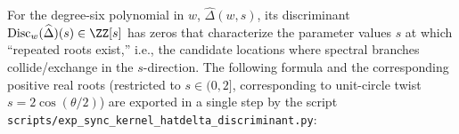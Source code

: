 \begin{remark}\label{rem:sync-hatdelta-discriminant-branch}
For the degree-six polynomial in \(w\), \(\widehat\Delta(w,s)\), its discriminant \(\mathrm{Disc}_w(\widehat\Delta)(s)\in\ZZ[s]\) has zeros that characterize the parameter values \(s\) at which ``repeated roots exist,'' i.e., the candidate locations where spectral branches collide/exchange in the \(s\)-direction.
The following formula and the corresponding positive real roots (restricted to \(s\in(0,2]\), corresponding to unit-circle twist \(s=2\cos(\theta/2)\)) are exported in a single step by the script \texttt{scripts/exp\_sync\_kernel\_hatdelta\_discriminant.py}:


\end{remark}

